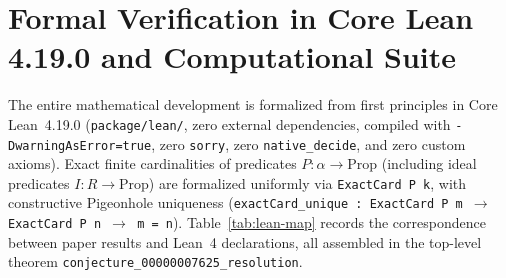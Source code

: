 \documentclass[11pt]{article}
\theoremstyle{definition}
\begin{document}
\section{Formal Verification in Core Lean 4.19.0 and Computational Suite}

The entire mathematical development is formalized from first principles in Core
Lean~4.19.0 (\texttt{package/lean/}, zero external dependencies, compiled with
\texttt{-DwarningAsError=true}, zero \texttt{sorry}, zero \texttt{native\_decide},
and zero custom axioms). Exact finite cardinalities of predicates $P : \alpha \to
\mathrm{Prop}$ (including ideal predicates $I : R \to \mathrm{Prop}$) are
formalized uniformly via \texttt{ExactCard P k}, with constructive Pigeonhole
uniqueness (\texttt{exactCard\_unique : ExactCard P m $\to$ ExactCard P n $\to$
m = n}). Table~\ref{tab:lean-map} records the correspondence between paper
results and Lean~4 declarations, all assembled in the top-level theorem
\texttt{conjecture\_00000007625\_resolution}.
\end{document}
